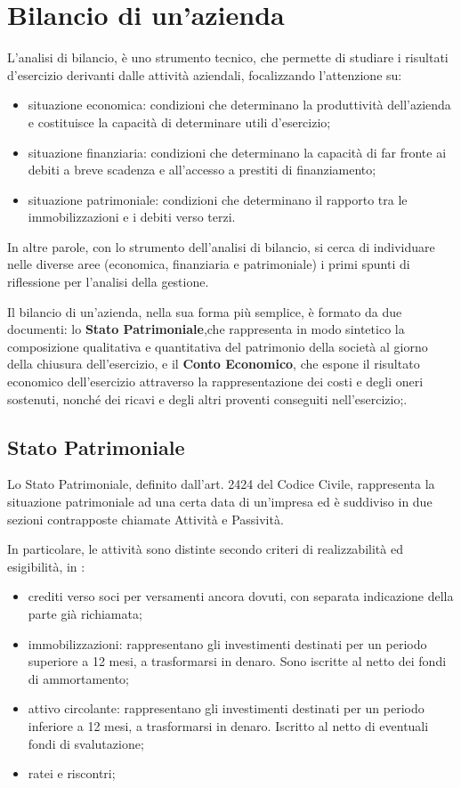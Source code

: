 
\chapter{Bilancio di un'azienda}

L’analisi di bilancio, è uno strumento tecnico, che permette di studiare i risultati d’esercizio derivanti dalle attività aziendali, focalizzando l’attenzione su:
\begin{itemize}
 \item situazione economica: condizioni che determinano la produttività dell’azienda e costituisce la capacità di determinare utili d’esercizio;
 \item situazione finanziaria: condizioni che determinano la capacità di far fronte ai debiti a breve scadenza e all’accesso a prestiti di finanziamento;
 \item situazione patrimoniale: condizioni che determinano il rapporto tra le immobilizzazioni e i debiti verso terzi.
\end{itemize}
In altre parole, con lo strumento dell’analisi di bilancio, si cerca di individuare nelle diverse aree (economica, finanziaria e patrimoniale) i primi spunti di riflessione per l’analisi della gestione.

Il bilancio di un'azienda, nella sua forma più semplice, è formato da due documenti: lo \textbf{Stato Patrimoniale},che rappresenta in modo sintetico la composizione qualitativa e quantitativa del patrimonio della società al giorno della chiusura dell’esercizio, e il \textbf{Conto Economico}, che espone il risultato economico dell’esercizio attraverso la rappresentazione dei costi e degli oneri sostenuti, nonché dei ricavi e degli altri proventi conseguiti nell’esercizio;.



\section{Stato Patrimoniale}

Lo Stato Patrimoniale, definito dall'art. 2424 del Codice Civile, rappresenta la situazione patrimoniale ad una certa data di un'impresa ed è suddiviso in due sezioni contrapposte chiamate Attività e Passività.

In particolare, le attività sono distinte secondo criteri di realizzabilità ed esigibilità, in :
\begin{itemize}
 \item crediti verso soci per versamenti ancora dovuti, con separata indicazione della parte già richiamata;
 \item immobilizzazioni: rappresentano gli investimenti destinati per un periodo superiore a 12 mesi, a trasformarsi in denaro. Sono iscritte al netto dei fondi di ammortamento;
 \item attivo circolante: rappresentano gli investimenti destinati per un periodo inferiore a 12 mesi, a trasformarsi in denaro. Iscritto al netto di eventuali fondi di svalutazione;
 \item ratei e riscontri;
\end{itemize}

